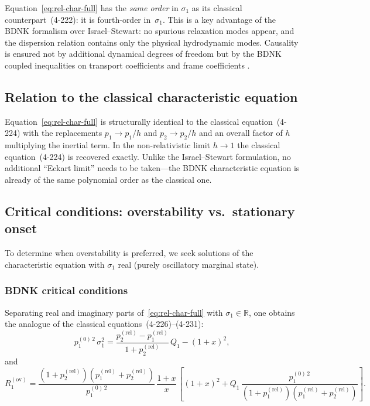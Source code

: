 \begin{relcorrection}
Equation~\eqref{eq:rel-char-full} has the \emph{same order} in
$\sigma_{1}$ as its classical counterpart~(4-222): it is fourth-order
in~$\sigma_{1}$.  This is a key advantage of the BDNK formalism over
Israel--Stewart: no spurious relaxation modes appear, and the dispersion
relation contains only the physical hydrodynamic modes.  Causality is
ensured not by additional dynamical degrees of freedom but by the BDNK
coupled inequalities on transport coefficients and frame coefficients
\citep{BemficaDN2018,Kovtun2019,BemficaDNK2023}.
\end{relcorrection}

\subsection{Relation to the classical characteristic equation}
\label{subsec:rel-46-classical}

Equation~\eqref{eq:rel-char-full} is structurally identical to the
classical equation~(4-224) with the replacements
$p_{1}\to p_{1}/h$ and $p_{2}\to p_{2}/h$ and an overall factor of $h$
multiplying the inertial term.  In the non-relativistic limit $h\to 1$
the classical equation~(4-224) is recovered exactly.  Unlike the
Israel--Stewart formulation, no additional ``Eckart limit'' needs to be
taken---the BDNK characteristic equation is already of the same
polynomial order as the classical one.

\subsection{Critical conditions: overstability vs.\ stationary onset}
\label{subsec:rel-46-critical}

To determine when overstability is preferred, we seek solutions of the
characteristic equation with $\sigma_{1}$ real (purely oscillatory
marginal state).

\subsubsection{BDNK critical conditions}

Separating real and imaginary parts of~\eqref{eq:rel-char-full} with
$\sigma_{1}\in\mathbb{R}$, one obtains the analogue of the classical
equations~(4-226)--(4-231):
\begin{equation}
  p_{1}^{(0)\,2}\,\sigma_{1}^{2}
  = \frac{p_{2}^{(\mathrm{rel})}-p_{1}^{(\mathrm{rel})}}{1+p_{2}^{(\mathrm{rel})}}\,Q_{1}
    - (1+x)^{2} ,
  \label{eq:rel-sigma1-sq}
\end{equation}
and
\begin{equation}
  R_{1}^{(\mathrm{ov})}
  = \frac{(1+p_{2}^{(\mathrm{rel})})(p_{1}^{(\mathrm{rel})}+p_{2}^{(\mathrm{rel})})}{p_{1}^{(0)\,2}}
    \,\frac{1+x}{x}\,
    \left[(1+x)^{2}
    + Q_{1}\,\frac{p_{1}^{(0)\,2}}{(1+p_{1}^{(\mathrm{rel})})(p_{1}^{(\mathrm{rel})}+p_{2}^{(\mathrm{rel})})}\right] .
  \label{eq:rel-R1-overstab}
\end{equation}

